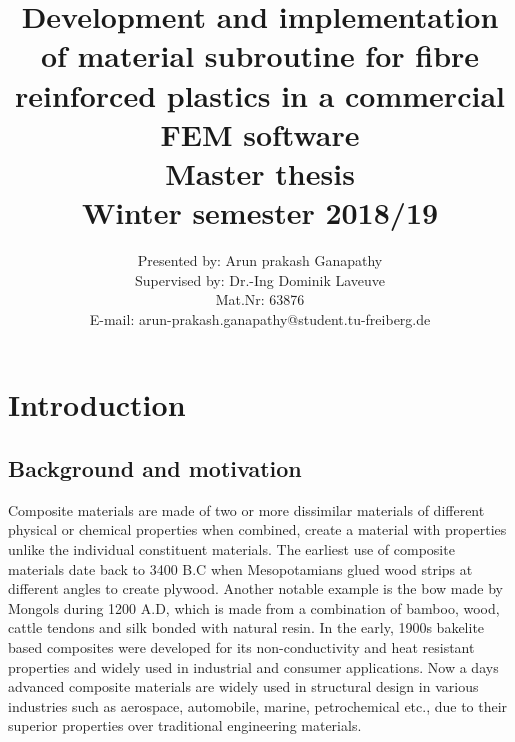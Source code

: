 \documentclass[a4paper,14pt]{extarticle}
\title{\LARGE{\textbf{Development and implementation of material subroutine for fibre reinforced plastics in a commercial FEM software}}\\[0.7cm]\smaller \textbf{Master thesis \\[0.5cm] Winter semester 2018/19}\vspace*{1cm}}
\author{
\vspace{2cm}
\large{Presented by: Arun prakash Ganapathy}
\\[0.4cm]
\large{Supervised by: Dr.-Ing Dominik Laveuve}
\\[0.4cm]
\large{Mat.Nr: 63876}
\\[0.4cm]
\large{E-mail: arun-prakash.ganapathy@student.tu-freiberg.de}}
\date{}
\begin{document}
\maketitle
\newpage
\section{Introduction}
\subsection{Background and motivation}
\indent\indent Composite materials are made of two or more dissimilar materials of different physical or chemical properties when combined, create a material with properties unlike the individual constituent materials. The earliest use of composite materials date back to 3400 B.C when Mesopotamians glued wood strips at different angles to create plywood. Another notable example is the bow made by Mongols during 1200 A.D, which is made from a combination of bamboo, wood, cattle tendons and silk bonded with natural resin. In the early, 1900s bakelite based composites were developed for its non-conductivity and heat resistant properties and widely used in industrial and consumer applications. Now a days advanced composite materials are widely used in structural design in various industries such as aerospace, automobile, marine, petrochemical etc., due to their superior properties over traditional engineering materials.\\
\end{document}
